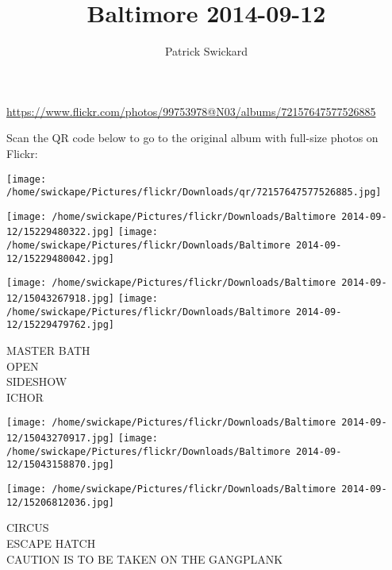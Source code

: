 \documentclass[10pt,letterpaper]{article}
\title{Baltimore 2014-09-12}
\author{Patrick Swickard}
\date{}
\begin{document}
\maketitle

\url{https://www.flickr.com/photos/99753978@N03/albums/72157647577526885}

Scan the QR code below to go to the original album with full-size photos on Flickr:

\texttt{[image: /home/swickape/Pictures/flickr/Downloads/qr/72157647577526885.jpg]}
\pagebreak

\texttt{[image: /home/swickape/Pictures/flickr/Downloads/Baltimore 2014-09-12/15229480322.jpg]}
\texttt{[image: /home/swickape/Pictures/flickr/Downloads/Baltimore 2014-09-12/15229480042.jpg]}

\texttt{[image: /home/swickape/Pictures/flickr/Downloads/Baltimore 2014-09-12/15043267918.jpg]}
\texttt{[image: /home/swickape/Pictures/flickr/Downloads/Baltimore 2014-09-12/15229479762.jpg]}

MASTER BATH\\
OPEN\\
SIDESHOW\\
ICHOR
\pagebreak

\texttt{[image: /home/swickape/Pictures/flickr/Downloads/Baltimore 2014-09-12/15043270917.jpg]}
\texttt{[image: /home/swickape/Pictures/flickr/Downloads/Baltimore 2014-09-12/15043158870.jpg]}

\texttt{[image: /home/swickape/Pictures/flickr/Downloads/Baltimore 2014-09-12/15206812036.jpg]}

CIRCUS\\
ESCAPE HATCH\\
CAUTION IS TO BE TAKEN ON THE GANGPLANK
\pagebreak
\end{document}
